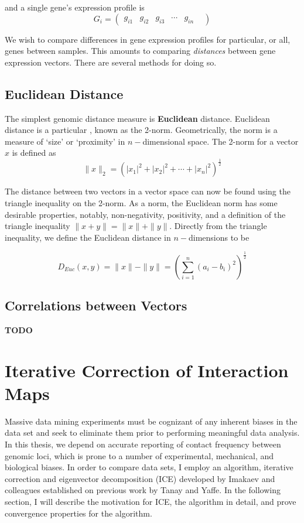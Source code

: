 \documentclass[phd,tocprelim]{cornell}
\begin{document}
and a single gene's expression profile is
\[ G_{i} = \begin{pmatrix} g_{i1} & g_{i2} & g_{i3} & \cdots & g_{in} & \end{pmatrix} \]

We wish to compare differences in gene expression profiles for particular, or all, genes between samples.  This amounts to comparing
\textit{distances} between gene expression vectors.  There are several methods for doing so.

\subsection{Euclidean Distance}

The simplest genomic distance measure is \textbf{Euclidean} distance.  Euclidean distance is a particular , known as
the 2-norm.  Geometrically, the norm is a measure of `size' or `proximity' in $n-$dimensional space.  The 2-norm for a vector $x$ is
defined as
\[
  \|x\|_{2} = {(|x_1|^2 + |x_2|^2 + \cdots + |x_n|^2)}^{\frac{1}{2}}
\]

The distance between two vectors in a vector space can now be found using the triangle inequality on the 2-norm.  As a norm, the Euclidean
norm has some desirable properties, notably, non-negativity, positivity, and a definition of the triangle inequality
$\|x + y\| = \|x\| + \|y\|$\cite{horn2013}.  Directly from the triangle inequality, we define the Euclidean distance
in $n-$dimensions to be

\[
  D_{Euc}(x,y) = \|x\| - \|y\| = {(\sum_{i=1}^{n}{(a_i - b_i)}^2)}^{\frac{1}{2}}
\]

\subsection{Correlations between Vectors}

\textbf{TODO}

\section{Iterative Correction of Interaction Maps}

Massive data mining experiments must be cognizant of any inherent biases in the data set and seek to eliminate them prior to performing
meaningful data analysis.  In this thesis, we depend on accurate reporting of contact frequency between genomic loci, which is prone
to a number of experimental, mechanical, and biological biases\cite{dekker2006}.  In order to compare data sets, I employ an algorithm,
iterative correction and eigenvector decomposition (ICE) developed by Imakaev and colleagues\cite{imakaev2012} established on previous
work by Tanay and Yaffe\cite{yaffe2011}.  In the following section, I will describe the motivation for ICE, the algorithm in detail, and
prove convergence properties for the algorithm.
\end{document}
